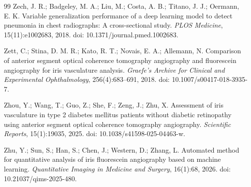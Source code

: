 \documentclass[12pt,a4paper]{article}
\begin{document}
\begin{thebibliography}{99}
Zech, J. R.; Badgeley, M. A.; Liu, M.; Costa, A. B.; Titano, J. J.; Oermann, E. K.
\newblock Variable generalization performance of a deep learning model to detect pneumonia in chest
radiographs: A cross-sectional study.
\newblock \emph{PLOS Medicine}, 15(11):e1002683, 2018.
\newblock doi: 10.1371/journal.pmed.1002683.

Zett, C.; Stina, D. M. R.; Kato, R. T.; Novais, E. A.; Allemann, N.
\newblock Comparison of anterior segment optical coherence tomography angiography and fluorescein
angiography for iris vasculature analysis.
\newblock \emph{Graefe's Archive for Clinical and Experimental Ophthalmology}, 256(4):683--691, 2018.
\newblock doi: 10.1007/s00417-018-3935-7.

Zhou, Y.; Wang, T.; Guo, Z.; She, F.; Zeng, J.; Zhu, X.
\newblock Assessment of iris vasculature in type 2 diabetes mellitus patients without diabetic
retinopathy using anterior segment optical coherence tomography angiography.
\newblock \emph{Scientific Reports}, 15(1):19035, 2025.
\newblock doi: 10.1038/s41598-025-04463-w.

Zhu, Y.; Sun, S.; Han, S.; Chen, J.; Western, D.; Zhang, L.
\newblock Automated method for quantitative analysis of iris fluorescein angiography based on machine
learning.
\newblock \emph{Quantitative Imaging in Medicine and Surgery}, 16(1):68, 2026.
\newblock doi: 10.21037/qims-2025-480.

\end{thebibliography}
\end{document}
